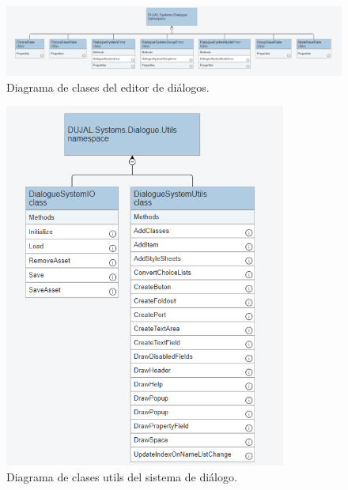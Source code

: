 \begin{figure}[H]
  \centering
    \includegraphics[width=500px,clip=true]{Dialogue_UML.png}
  \caption{Diagrama de clases del editor de diálogos.}
  \label{fig:dialogueUml1}
\end{figure}

\begin{figure}[H]
  \centering
    \includegraphics[width=350px,clip=true]{Dialogue_System_Utils.png}
  \caption{Diagrama de clases utils del sistema de diálogo.}
  \label{fig:dialogueUml2}
\end{figure}

